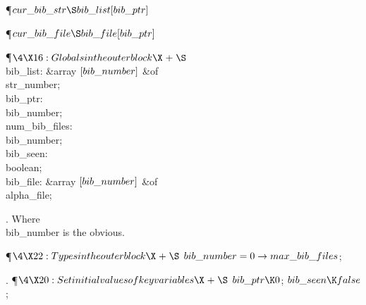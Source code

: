 \Y\P\D {}$\\{cur\_bib\_str}\S\\{bib\_list}[\\{bib\_ptr}]$\par
\P\D {}$\\{cur\_bib\_file}\S\\{bib\_file}[\\{bib\_ptr}]$\par
\Y\P$\4\X16:Globals in the outer block\X\mathrel{+}\S$\6
\4\\{bib\_list}: \&{array} $[\\{bib\_number}]$ \1\&{of}\5
\\{str\_number};\2\6
\4\\{bib\_ptr}: \\{bib\_number};\6
\4\\{num\_bib\_files}: \\{bib\_number};\6
\4\\{bib\_seen}: \\{boolean};\6
\4\\{bib\_file}: \&{array} $[\\{bib\_number}]$ \1\&{of}\5
\\{alpha\_file};\2\par
\fi

.
Where \\{bib\_number} is the obvious.

\Y\P$\4\X22:Types in the outer block\X\mathrel{+}\S$\6
$\\{bib\_number}=0\to\\{max\_bib\_files}$;\par
\fi

.
\Y\P$\4\X20:Set initial values of key variables\X\mathrel{+}\S$\6
$\\{bib\_ptr}\K0$;\6
$\\{bib\_seen}\K\\{false}$;\par
\fi

